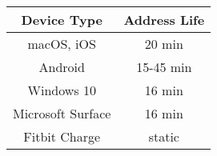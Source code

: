 \begin{tabular}{|c|c|}
	\hline
     \textbf{Device Type}    &   \textbf{Address Life}                
     \\ \hline
     macOS, iOS &  20 min             
     \\ \hline          
     Android    &   15-45 min  
     \\ \hline
     Windows 10          &   16 min           
     \\ \hline
     Microsoft Surface          &   16 min
     \\ \hline
     Fitbit Charge          &   static
     \\ \hline
\end{tabular}